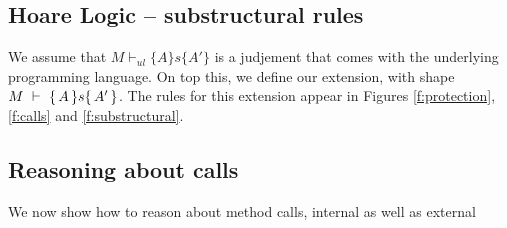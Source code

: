 \subsection{Hoare Logic -- substructural rules}

We assume that $M \vdash_{ul} \{ A \} s \{ A' \}$ is a judjement that comes with the underlying programming language.  On top this, we define our extension, with shape ${   M\ \vdash\ \{\,A\, \} s \{\,A'\, \}}$. The rules for this extension appear in Figures \ref{f:protection}, \ref{f:calls} and \ref{f:substructural}.


 
\subsection{Reasoning about calls}

We now show how to reason about method calls, internal as well as external

